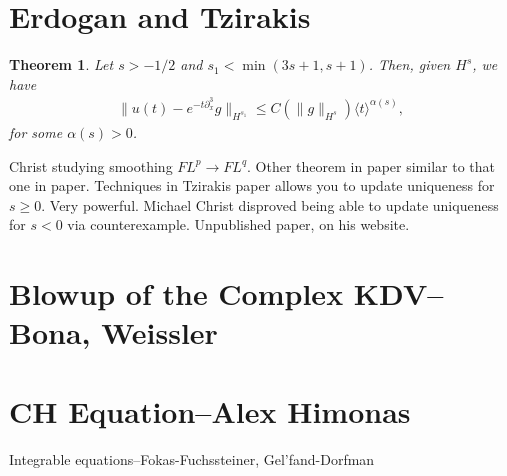 \documentclass[12pt,reqno]{amsart}
\numberwithin{equation}{section}  %
\newcommand{\p}{\partial}
\newtheorem{theorem}{Theorem}[section]
\begin{document}
       \section{Erdogan and Tzirakis}
       \begin{theorem}
         Let $s > -1/2$ and $s_{1} < \min(3s+1, s+1)$. Then, given $H^{s}$, we
         have
         \begin{equation*}
         \begin{split}
           \| u(t) - e^{-t \p_{x}^{3}}g \|_{H^{s_{1}}} \le C (\| g
           \|_{H^{s}}) \langle t \rangle^{\alpha(s)},
         \end{split}
         \end{equation*}
         for some $\alpha(s) > 0$.
       \label{thm:main3}
       \end{theorem}
       Christ studying smoothing $FL^{p} \to FL^{q}$. Other theorem in paper
       similar to that one in paper.
       Techniques in Tzirakis paper allows you to update uniqueness for $s \ge 0$.
       Very powerful.  Michael Christ disproved being able to update uniqueness
       for $s < 0$ via counterexample. Unpublished paper, on his website.
       \section{Blowup of the Complex KDV--Bona, Weissler} 
       \label{sec:kdv-blowup}
       \section{CH Equation--Alex Himonas} 
       \label{sec:him}
       Integrable equations--Fokas-Fuchssteiner, Gel'fand-Dorfman
       


\end{document}
